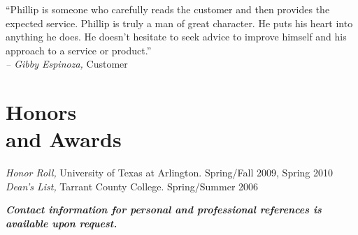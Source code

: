 \documentclass[margin]{res}
\newcommand{\sectionspace}{\vspace{8pt}}
\begin{document}
\begin{resume}
                ``Phillip is someone who carefully reads the customer and then 
                provides the expected service. Phillip is truly a man of great character. 
                He puts his heart into anything he does. He doesn't hesitate to seek advice 
                to improve himself and his approach to a service or product.''                    \\
                \textit{-- Gibby Espinoza,} Customer

\sectionspace
                

\section{\textsf{Honors \\and Awards}}
                
                \textit{Honor Roll,} University of Texas at Arlington. Spring/Fall 2009, Spring 2010 \\
                \textit{Dean's List,} Tarrant County College. Spring/Summer 2006

\sectionspace


\textit{\textbf{\footnotesize Contact information for personal and professional references is available upon request.}}

                
\end{resume}
\end{document}

